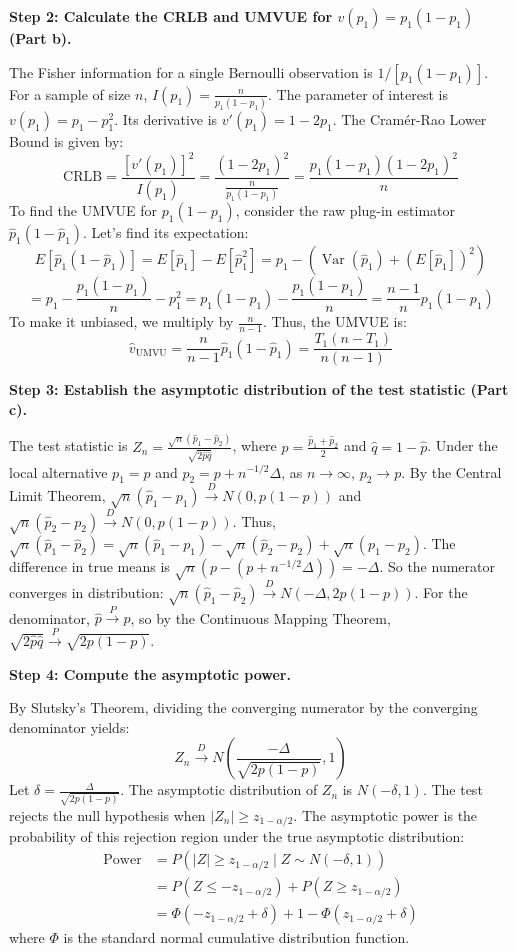 \begin{solution}
\textbf{Step 2: Calculate the CRLB and UMVUE for $v(p_1) = p_1(1-p_1)$ (Part b).}

The Fisher information for a single Bernoulli observation is $1/[p_1(1-p_1)]$. For a sample of size $n$, $I(p_1) = \frac{n}{p_1(1-p_1)}$.
The parameter of interest is $v(p_1) = p_1 - p_1^2$. Its derivative is $v'(p_1) = 1 - 2p_1$.
The Cramér-Rao Lower Bound is given by:
\[ \text{CRLB} = \frac{[v'(p_1)]^2}{I(p_1)} = \frac{(1-2p_1)^2}{\frac{n}{p_1(1-p_1)}} = \frac{p_1(1-p_1)(1-2p_1)^2}{n} \]
To find the UMVUE for $p_1(1-p_1)$, consider the raw plug-in estimator $\hat{p}_1(1-\hat{p}_1)$. Let's find its expectation:
\[ E[\hat{p}_1(1-\hat{p}_1)] = E[\hat{p}_1] - E[\hat{p}_1^2] = p_1 - \left( \operatorname{Var}(\hat{p}_1) + (E[\hat{p}_1])^2 \right) \]
\[ = p_1 - \frac{p_1(1-p_1)}{n} - p_1^2 = p_1(1-p_1) - \frac{p_1(1-p_1)}{n} = \frac{n-1}{n} p_1(1-p_1) \]
To make it unbiased, we multiply by $\frac{n}{n-1}$. Thus, the UMVUE is:
\[ \hat{v}_{\text{UMVU}} = \frac{n}{n-1} \hat{p}_1(1-\hat{p}_1) = \frac{T_1(n-T_1)}{n(n-1)} \]

\textbf{Step 3: Establish the asymptotic distribution of the test statistic (Part c).}

The test statistic is $Z_n = \frac{\sqrt{n}(\hat{p}_1 - \hat{p}_2)}{\sqrt{2\hat{p}\hat{q}}}$, where $\hat{p} = \frac{\hat{p}_1 + \hat{p}_2}{2}$ and $\hat{q} = 1 - \hat{p}$.
Under the local alternative $p_1 = p$ and $p_2 = p + n^{-1/2}\Delta$, as $n \to \infty$, $p_2 \to p$.
By the Central Limit Theorem, $\sqrt{n}(\hat{p}_1 - p_1) \xrightarrow{D} N(0, p(1-p))$ and $\sqrt{n}(\hat{p}_2 - p_2) \xrightarrow{D} N(0, p(1-p))$.
Thus, $\sqrt{n}(\hat{p}_1 - \hat{p}_2) = \sqrt{n}(\hat{p}_1 - p_1) - \sqrt{n}(\hat{p}_2 - p_2) + \sqrt{n}(p_1 - p_2)$.
The difference in true means is $\sqrt{n}(p - (p + n^{-1/2}\Delta)) = -\Delta$.
So the numerator converges in distribution: $\sqrt{n}(\hat{p}_1 - \hat{p}_2) \xrightarrow{D} N(-\Delta, 2p(1-p))$.
For the denominator, $\hat{p} \xrightarrow{P} p$, so by the Continuous Mapping Theorem, $\sqrt{2\hat{p}\hat{q}} \xrightarrow{P} \sqrt{2p(1-p)}$.

\textbf{Step 4: Compute the asymptotic power.}

By Slutsky's Theorem, dividing the converging numerator by the converging denominator yields:
\[ Z_n \xrightarrow{D} N\left( \frac{-\Delta}{\sqrt{2p(1-p)}}, 1 \right) \]
Let $\delta = \frac{\Delta}{\sqrt{2p(1-p)}}$. The asymptotic distribution of $Z_n$ is $N(-\delta, 1)$.
The test rejects the null hypothesis when $|Z_n| \geq z_{1-\alpha/2}$.
The asymptotic power is the probability of this rejection region under the true asymptotic distribution:
\begin{align*}
\text{Power} &= P(|Z| \geq z_{1-\alpha/2} \mid Z \sim N(-\delta, 1)) \\
&= P(Z \leq -z_{1-\alpha/2}) + P(Z \geq z_{1-\alpha/2}) \\
&= \Phi(-z_{1-\alpha/2} + \delta) + 1 - \Phi(z_{1-\alpha/2} + \delta)
\end{align*}
where $\Phi$ is the standard normal cumulative distribution function.
\end{solution}

